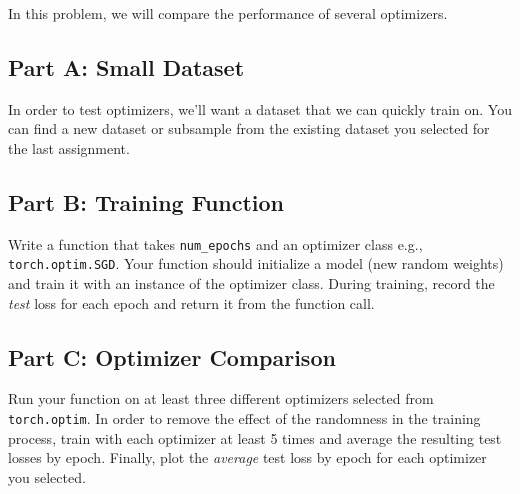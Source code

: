 \documentclass{article}
\begin{document}
In this problem, we will compare the performance of several optimizers.

\subsection*{Part A: Small Dataset}

In order to test optimizers, we'll want a dataset that we can quickly train on. You can find a new dataset or subsample from the existing dataset you selected for the last assignment.

\subsection*{Part B: Training Function}

Write a function that takes \texttt{num\_epochs} and an optimizer class e.g., \texttt{torch.optim.SGD}.
Your function should initialize a model (new random weights) and train it with an instance of the optimizer class.
During training, record the \textit{test} loss for each epoch and return it from the function call.

\subsection*{Part C: Optimizer Comparison}

Run your function on at least three different optimizers selected from \texttt{torch.optim}.
In order to remove the effect of the randomness in the training process, train with each optimizer at least 5 times and average the resulting test losses by epoch.
Finally, plot the \textit{average} test loss by epoch for each optimizer you selected.

%
\end{document}
